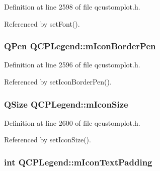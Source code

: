 Definition at line 2598 of file qcustomplot.\+h.



Referenced by set\+Font().

\hypertarget{class_q_c_p_legend_a773ae518c3149fcabff4a2906fdacbc4}{}
\subsubsection[{m\+Icon\+Border\+Pen}]{\setlength{\rightskip}{0pt plus 5cm}Q\+Pen Q\+C\+P\+Legend\+::m\+Icon\+Border\+Pen\hspace{0.3cm}{\ttfamily [protected]}}\label{class_q_c_p_legend_a773ae518c3149fcabff4a2906fdacbc4}


Definition at line 2596 of file qcustomplot.\+h.



Referenced by set\+Icon\+Border\+Pen().

\hypertarget{class_q_c_p_legend_a39b972aae6c6a3fa5aa73313ab7a5765}{}
\subsubsection[{m\+Icon\+Size}]{\setlength{\rightskip}{0pt plus 5cm}Q\+Size Q\+C\+P\+Legend\+::m\+Icon\+Size\hspace{0.3cm}{\ttfamily [protected]}}\label{class_q_c_p_legend_a39b972aae6c6a3fa5aa73313ab7a5765}


Definition at line 2600 of file qcustomplot.\+h.



Referenced by set\+Icon\+Size().

\hypertarget{class_q_c_p_legend_a8abf8843864ee9afc3f54f906c062240}{}
\subsubsection[{m\+Icon\+Text\+Padding}]{\setlength{\rightskip}{0pt plus 5cm}int Q\+C\+P\+Legend\+::m\+Icon\+Text\+Padding\hspace{0.3cm}{\ttfamily [protected]}}\label{class_q_c_p_legend_a8abf8843864ee9afc3f54f906c062240}


